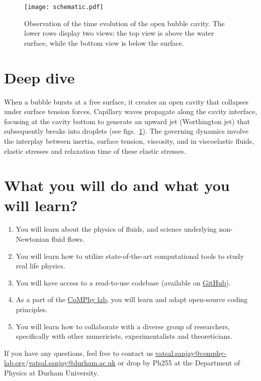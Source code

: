 \documentclass[11pt]{article}
\begin{document}
    
\begin{figure}[H]
\begin{center}
    \texttt{[image: schematic.pdf]}
    \caption{Observation of the time evolution of the open bubble cavity. The lower rows display two views: the top view is above the water surface, while the bottom view is below the surface. }
    \label{Figure::Waves}
\end{center}
\end{figure}

\section*{Deep dive}

When a bubble bursts at a free surface, it creates an open cavity that collapses under surface tension forces. Capillary waves propagate along the cavity interface, focusing at the cavity bottom to generate an upward jet (Worthington jet) that subsequently breaks into droplets (see figs.~\ref{Figure::Waves}). The governing dynamics involve the interplay between inertia, surface tension, viscosity, and in viscoelastic fluids, elastic stresses and relaxation time of these elastic stresses.

\section*{What you will do and what you will learn?}

\begin{enumerate}
\item You will learn about the physics of fluids, and science underlying non-Newtonian fluid flows. 
\item You will learn how to utilize state-of-the-art computational tools to study real life physics. 
\item You will have access to a read-to-use codebase (available on \href{https://comphy-lab.org/MultiRheoFlow}{GitHub}).
\item As a part of the \href{https://comphy-lab.org}{CoMPhy lab}, you will learn and adapt open-source coding principles. 
\item You will learn how to collaborate with a diverse group of researchers, specifically with other numericists, experimentalists and theoreticians.

\end{enumerate}

\noindent If you have any questions, feel free to contact us \href{mailto:vatsal.sanjay@comphy-lab.org}{vatsal.sanjay@comphy-lab.org}/\href{mailto:vatsal.sanjay@durham.ac.uk}{vatsal.sanjay@durham.ac.uk} or drop by Ph255 at the Department of Physics at Durham University.
\end{document}
